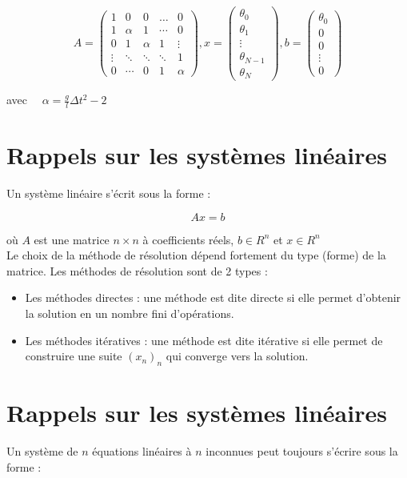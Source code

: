 \documentclass[10pt]{article}
\begin{document}
\[
A=\left(\begin{array}{ccccc}
1 & 0 & 0 & \ldots & 0 \\
1 & \alpha & 1 & \cdots & 0 \\
0 & 1 & \alpha & 1 & \vdots \\
\vdots & \ddots & \ddots & \ddots & 1 \\
0 & \cdots & 0 & 1 & \alpha
\end{array}\right), x=\left(\begin{array}{c}
\theta_{0} \\
\theta_{1} \\
\vdots \\
\theta_{N-1} \\
\theta_{N}
\end{array}\right), b=\left(\begin{array}{c}
\theta_{0} \\
0 \\
0 \\
\vdots \\
0
\end{array}\right)
\]

avec \(\quad \alpha=\frac{g}{l} \Delta t^{2}-2\)

\section*{Rappels sur les systèmes linéaires}
Un système linéaire s'écrit sous la forme :

\[
A x=b
\]

où \(A\) est une matrice \(n \times n\) à coefficients réels, \(b \in R^{n}\) et \(x \in R^{n}\)\\
Le choix de la méthode de résolution dépend fortement du type (forme) de la matrice. Les méthodes de résolution sont de 2 types :

\begin{itemize}
  \item Les méthodes directes : une méthode est dite directe si elle permet d'obtenir la solution en un nombre fini d'opérations.
  \item Les méthodes itératives : une méthode est dite itérative si elle permet de construire une suite \(\left(x_{n}\right)_{n}\) qui converge vers la solution.
\end{itemize}

\section*{Rappels sur les systèmes linéaires}
Un système de \(n\) équations linéaires à \(n\) inconnues peut toujours s'écrire sous la forme :
\end{document}
